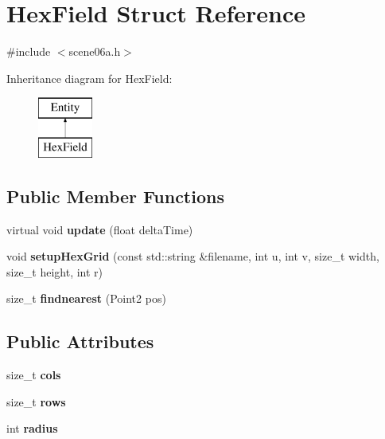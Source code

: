\hypertarget{struct_hex_field}{}\section{Hex\+Field Struct Reference}
\label{struct_hex_field}


{\ttfamily \#include $<$scene06a.\+h$>$}

Inheritance diagram for Hex\+Field\+:\begin{figure}[H]
\begin{center}
\leavevmode
\includegraphics[height=2.000000cm]{struct_hex_field}
\end{center}
\end{figure}
\subsection*{Public Member Functions}
\begin{DoxyCompactItemize}
\item 
\mbox{\label{struct_hex_field_a6199c5217338947bee4a23601894dabb}} 
virtual void {\bfseries update} (float delta\+Time)
\item 
\mbox{\label{struct_hex_field_a3ee344d8d07e5c39cf69eeb76a397aa9}} 
void {\bfseries setup\+Hex\+Grid} (const std\+::string \&filename, int u, int v, size\+\_\+t width, size\+\_\+t height, int r)
\item 
\mbox{\label{struct_hex_field_a472962acbc5479f055ac82912f1b9f89}} 
size\+\_\+t {\bfseries findnearest} (Point2 pos)
\end{DoxyCompactItemize}
\subsection*{Public Attributes}
\begin{DoxyCompactItemize}
\item 
\mbox{\label{struct_hex_field_a048e97d656dec37b3fc7765c004687b5}} 
size\+\_\+t {\bfseries cols}
\item 
\mbox{\label{struct_hex_field_a0806894ce678db6f370eb53475e7a24a}} 
size\+\_\+t {\bfseries rows}
\item 
\mbox{\label{struct_hex_field_a3ce28371f9ab4f575b64bfb2154b7415}} 
int {\bfseries radius}
\end{DoxyCompactItemize}


